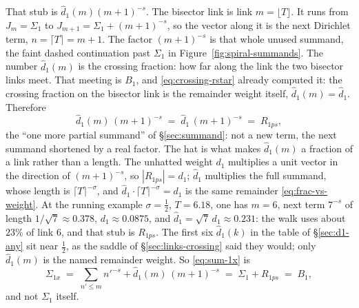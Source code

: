 \documentclass[11pt]{article}
\theoremstyle{definition}
\begin{document}
That stub is \(\hat d_1(m)(m+1)^{-s}\). The bisector link is link
\(m=\lfloor T\rfloor\). It runs from \(J_m=\Sigma_1\) to
\(J_{m+1}=\Sigma_1+(m+1)^{-s}\), so the vector along it is the next Dirichlet
term, \(n=\lceil T\rceil=m+1\). The factor \((m+1)^{-s}\) is that whole
unused summand, the faint dashed continuation past \(\Sigma_1\) in
Figure~\ref{fig:spiral-summands}. The number \(\hat d_1(m)\) is the crossing
fraction: how far along the link the two bisector links meet. That meeting is \(B_1\), and
\eqref{eq:crossing-rstar} already computed it: the crossing fraction on the
bisector link is the remainder weight itself,
\(\hat d_1(m)=\hat d_1\). Therefore
\begin{equation}\label{eq:sum-1x-remainder}
\hat d_1(m)\,(m+1)^{-s}
\;=\;
\hat d_1\,(m+1)^{-s}
\;=\;
R_{1ps},
\end{equation}
the ``one more partial summand'' of \S\ref{sec:summand}: not a new term, the
next summand shortened by a real factor. The hat is what makes \(\hat d_1(m)\) a
fraction of a link rather than a length. The unhatted weight \(d_1\)
multiplies a unit vector in the direction of \((m+1)^{-s}\), so
\(|R_{1ps}|=d_1\); \(\hat d_1\) multiplies the full summand, whose length is
\(\lceil T\rceil^{-\sigma}\), and
\(\hat d_1\cdot\lceil T\rceil^{-\sigma}=d_1\) is the same remainder
\eqref{eq:frac-vs-weight}. At the running example \(\sigma=\tfrac12\),
\(T=6.18\), one has \(m=6\), next term \(7^{-s}\) of length
\(1/\sqrt7\approx0.378\), \(d_1\approx0.0875\), and
\(\hat d_1=\sqrt7\,d_1\approx0.231\): the walk uses about \(23\%\) of link
\(6\), and that stub is \(R_{1ps}\). The first six \(\hat d_1(k)\) in the table of
\S\ref{sec:d1-any} sit near \(\tfrac12\), as the saddle of
\S\ref{sec:links-crossing} said they would; only \(\hat d_1(m)\) is the named
remainder weight. So \eqref{eq:sum-1x} is
\begin{equation}\label{eq:sum-1x-B1}
\Sigma_{1x}
\;=\;
\sum_{n'\le m}n'^{-s}+\hat d_1(m)\,(m+1)^{-s}
\;=\;
\Sigma_1+R_{1ps}
\;=\;
B_1,
\end{equation}
and not \(\Sigma_1\) itself.
\end{document}
